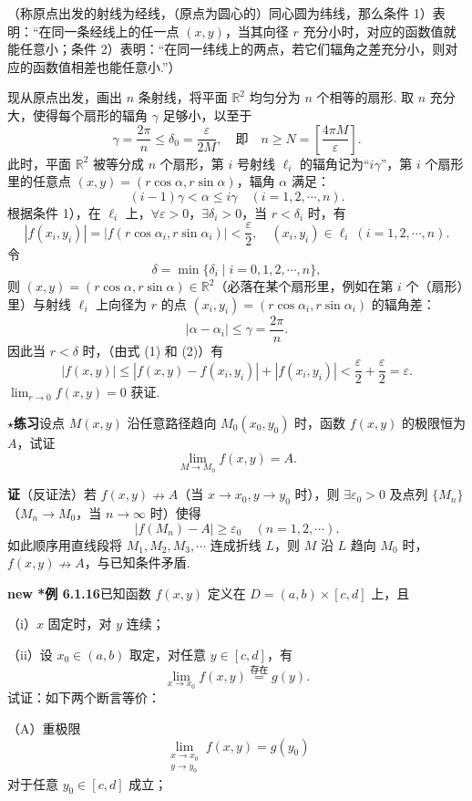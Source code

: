 \documentclass[UTF8,12pt,a4paper,fontset=fandol]{ctexart}
\begin{document}
（称原点出发的射线为经线，（原点为圆心的）同心圆为纬线，那么条件 1）表明：“在同一条经线上的任一点 $(x,y)$，当其向径 $r$ 充分小时，对应的函数值就能任意小；条件 2）表明：“在同一纬线上的两点，若它们辐角之差充分小，则对应的函数值相差也能任意小.”）

现从原点出发，画出 $n$ 条射线，将平面 $\mathbb{R}^2$ 均匀分为 $n$ 个相等的扇形. 取 $n$ 充分大，使得每个扇形的辐角 $\gamma$ 足够小，以至于
\[
  \gamma=\frac{2\pi}{n}\le\delta_0=\frac{\varepsilon}{2M},
  \quad\text{即}\quad n\ge N=\left[\frac{4\pi M}{\varepsilon}\right].
\]
此时，平面 $\mathbb{R}^2$ 被等分成 $n$ 个扇形，第 $i$ 号射线 $\ell_i$ 的辐角记为“$i\gamma$”，第 $i$ 个扇形里的任意点 $(x,y)=(r\cos\alpha,r\sin\alpha)$，辐角 $\alpha$ 满足：
\[
  (i-1)\gamma<\alpha\le i\gamma\quad (i=1,2,\cdots,n).
\]
根据条件 1），在 $\ell_i$ 上，$\forall\varepsilon>0$，$\exists\delta_i>0$，当 $r<\delta_i$ 时，有
\[
  |f(x_i,y_i)|=|f(r\cos\alpha_i,r\sin\alpha_i)|<\frac{\varepsilon}{2},
  \quad (x_i,y_i)\in\ell_i\ (i=1,2,\cdots,n).
\tag{2}
\]
令
\[
  \delta=\min\{\delta_i\mid i=0,1,2,\cdots,n\},
\]
则 $(x,y)=(r\cos\alpha,r\sin\alpha)\in\mathbb{R}^2$（必落在某个扇形里，例如在第 $i$ 个（扇形）里）与射线 $\ell_i$ 上向径为 $r$ 的点 $(x_i,y_i)=(r\cos\alpha_i,r\sin\alpha_i)$ 的辐角差：
\[
  |\alpha-\alpha_i|\le\gamma=\frac{2\pi}{n}.
\]
因此当 $r<\delta$ 时，（由式 (1) 和 (2)）有
\[
  |f(x,y)|\le |f(x,y)-f(x_i,y_i)|+|f(x_i,y_i)|
  <\frac{\varepsilon}{2}+\frac{\varepsilon}{2}=\varepsilon.
\]
$\displaystyle\lim_{r\to0}f(x,y)=0$ 获证.

\noindent\textbf{$\star$练习}\quad 设点 $M(x,y)$ 沿任意路径趋向 $M_0(x_0,y_0)$ 时，函数 $f(x,y)$ 的极限恒为 $A$，试证
\[
  \lim_{M\to M_0}f(x,y)=A.
\]

\noindent\textbf{证}\quad （反证法）若 $f(x,y)\nrightarrow A$（当 $x\to x_0,y\to y_0$ 时），则 $\exists\varepsilon_0>0$ 及点列 $\{M_n\}$（$M_n\to M_0$，当 $n\to\infty$ 时）使得
\[
  |f(M_n)-A|\ge\varepsilon_0\quad(n=1,2,\cdots).
\]
如此顺序用直线段将 $M_1,M_2,M_3,\cdots$ 连成折线 $L$，则 $M$ 沿 $L$ 趋向 $M_0$ 时，$f(x,y)\nrightarrow A$，与已知条件矛盾.

\noindent\textbf{new *例 6.1.16}\quad 已知函数 $f(x,y)$ 定义在 $D=(a,b)\times[c,d]$ 上，且

（i）$x$ 固定时，对 $y$ 连续；

（ii）设 $x_0\in(a,b)$ 取定，对任意 $y\in[c,d]$，有
\[
  \lim_{x\to x_0}f(x,y)\stackrel{\text{存在}}{=}g(y).
\]
试证：如下两个断言等价：

（A）重极限
\[
  \lim_{\substack{x\to x_0\\ y\to y_0}} f(x,y)=g(y_0)
\]
对于任意 $y_0\in[c,d]$ 成立；
\end{document}
